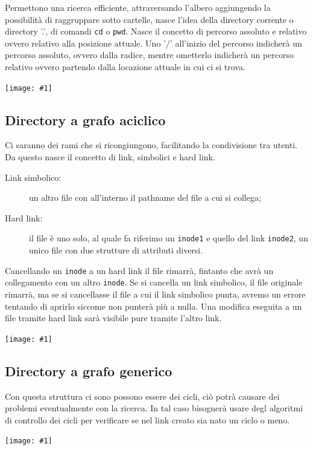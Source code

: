 \documentclass[a4paper, 12pt]{book}
\newcommand{\foto}[1]{\texttt{[image: \#1]}}
\begin{document}
Permettono una ricerca efficiente, attraversando l'albero 
aggiungendo la possibilità di raggruppare sotto cartelle,
nasce l'idea della directory corrente o directory '.', 
di comandi \verb|cd| o \verb|pwd|. Nasce il concetto di percorso 
assoluto e relativo ovvero relativo alla posizione attuale. Uno 
'/' all'inizio del percorso indicherà un percorso assoluto, ovvero 
dalla radice, mentre ometterlo indicherà un percorso relativo 
ovvero partendo dalla locazione attuale in cui ci si trova.
\begin{center}
    \foto{dir_albero.png}
\end{center}

\subsection{Directory a grafo aciclico}

Ci saranno dei rami che si ricongiungono, facilitando la condivisione 
tra utenti. Da questo nasce il concetto di link, simbolici 
e hard link. 
\begin{description}
    \item[Link simbolico:] un altro file con all'interno il pathname del file a cui si collega;
    \item[Hard link:] il file è uno solo, al quale fa riferimo un \verb|inode1| e quello del link \verb|inode2|, un unico file con due strutture di attributi diversi.  
\end{description}
Cancellando un \verb|inode| a un hard link il file rimarrà, fintanto che avrà 
un collegamento con un altro \verb|inode|. Se si cancella un 
link simbolico, il file originale rimarrà, ma se si cancellasse 
il file a cui il link simbolico punta, avremo un errore 
tentando di aprirlo siccome non punterà più a nulla.
Una modifica eseguita a un file tramite hard link sarà 
visibile pure tramite l'altro link.
\begin{center}
    \foto{dir_grafo.png}
\end{center}

\subsection{Directory a grafo generico}

Con questa struttura ci sono possono essere dei cicli, 
ciò potrà causare dei problemi eventualmente con la 
ricerca. In tal caso bisognerà usare degl algoritmi di controllo 
dei cicli per verificare se nel link creato sia nato un 
ciclo o meno.
\begin{center}
    \foto{dir_gen.png}
\end{center}
\end{document}
